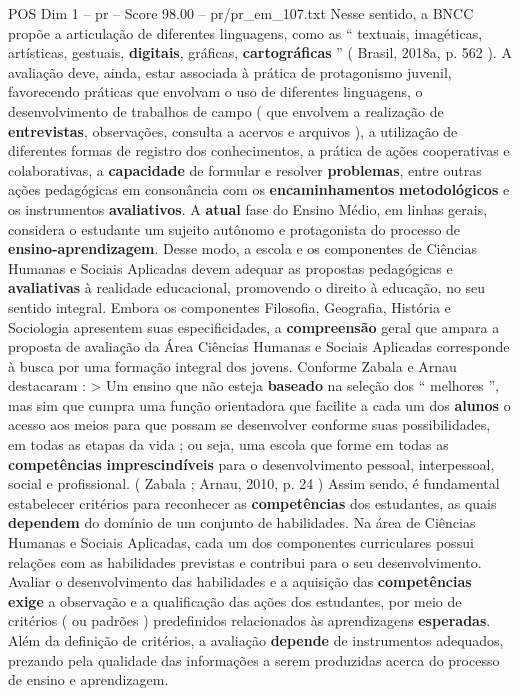 \begin{textsample}{POS Dim 1 – pr – Score 98.00 – pr/pr\_em\_107.txt}
Nesse sentido, a BNCC propõe a articulação de diferentes linguagens, como as “ textuais, imagéticas, artísticas, gestuais, \textbf{digitais}, gráficas, \textbf{cartográficas} ” ( Brasil, 2018a, p. 562 ).
A avaliação deve, ainda, estar associada à prática de protagonismo juvenil, favorecendo práticas que envolvam o uso de diferentes linguagens, o desenvolvimento de trabalhos de campo ( que envolvem a realização de \textbf{entrevistas}, observações, consulta a acervos e arquivos ), a utilização de diferentes formas de registro dos conhecimentos, a prática de ações cooperativas e colaborativas, a \textbf{capacidade} de formular e resolver \textbf{problemas}, entre outras ações pedagógicas em consonância com os \textbf{encaminhamentos} \textbf{metodológicos} e os instrumentos \textbf{avaliativos}.
A \textbf{atual} fase do Ensino Médio, em linhas gerais, considera o estudante um sujeito autônomo e protagonista do processo de \textbf{ensino-aprendizagem}.
Desse modo, a escola e os componentes de Ciências Humanas e Sociais Aplicadas devem adequar as propostas pedagógicas e \textbf{avaliativas} à realidade educacional, promovendo o direito à educação, no seu sentido integral.
Embora os componentes Filosofia, Geografia, História e Sociologia apresentem suas especificidades, a \textbf{compreensão} geral que ampara a proposta de avaliação da Área Ciências Humanas e Sociais Aplicadas corresponde à busca por uma formação integral dos jovens.
Conforme Zabala e Arnau destacaram : > Um ensino que não esteja \textbf{baseado} na seleção dos “ melhores ”, mas sim que cumpra uma função orientadora que facilite a cada um dos \textbf{alunos} o acesso aos meios para que possam se desenvolver conforme suas possibilidades, em todas as etapas da vida ; ou seja, uma escola que forme em todas as \textbf{competências} \textbf{imprescindíveis} para o desenvolvimento pessoal, interpessoal, social e profissional. ( Zabala ; Arnau, 2010, p. 24 ) Assim sendo, é fundamental estabelecer critérios para reconhecer as \textbf{competências} dos estudantes, as quais \textbf{dependem} do domínio de um conjunto de habilidades.
Na área de Ciências Humanas e Sociais Aplicadas, cada um dos componentes curriculares possui relações com as habilidades previstas e contribui para o seu desenvolvimento.
Avaliar o desenvolvimento das habilidades e a aquisição das \textbf{competências} \textbf{exige} a observação e a qualificação das ações dos estudantes, por meio de critérios ( ou padrões ) predefinidos relacionados às aprendizagens \textbf{esperadas}.
Além da definição de critérios, a avaliação \textbf{depende} de instrumentos adequados, prezando pela qualidade das informações a serem produzidas acerca do processo de ensino e aprendizagem.

\end{textsample}
